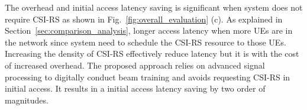 \documentclass[journal]{IEEEtran}
\begin{document}
The overhead and initial access latency saving is significant when system does not require CSI-RS as shown in Fig.~\ref{fig:overall_evaluation} (c). As explained in Section~\ref{sec:comparison_analysis}, longer access latency when more UEs are in the network since system need to schedule the CSI-RS resource to those UEs. Increasing the density of CSI-RS effectively reduce latency but it is with the cost of increased overhead. The proposed approach relies on advanced signal processing to digitally conduct beam training and avoids requesting CSI-RS in initial access. It results in a initial access latency saving by two order of magnitudes.



\end{document}
